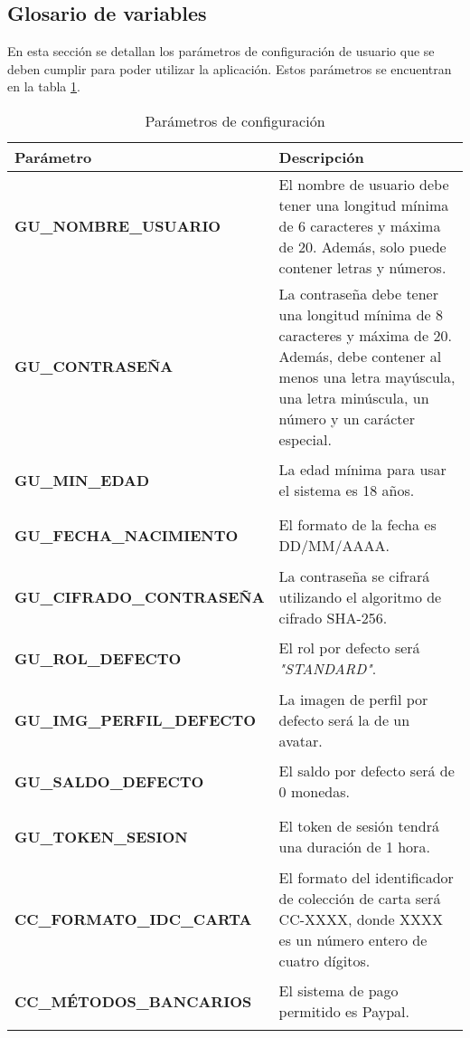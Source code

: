 \subsection{Glosario de variables}\hypertarget{anexo:glosario_variables}{}
En esta sección se detallan los parámetros de configuración de usuario que se deben cumplir para poder utilizar la aplicación. Estos parámetros se encuentran en la tabla \ref{table:variables_requisitos}.
\begin{table}[htb]
    \centering
    \caption{Parámetros de configuración}
    \label{table:variables_requisitos}
    \begin{tabular}{>{\columncolor{lightgreen!20}}p{7cm} p{10cm}}
    \toprule
    \rowcolor{darkgreen!50}
    \textbf{Parámetro} & \textbf{Descripción} \\
    \midrule
    \hypertarget{confParam:gu-nombreUsuario}{}
    \textbf{GU\_NOMBRE\_USUARIO} & El nombre de usuario debe tener una longitud mínima de 6 caracteres y máxima de 20. Además, solo puede contener letras y números.  \\
    \midrule
    \hypertarget{confParam:gu-contrasena}{}
    \textbf{GU\_CONTRASEÑA} & La contraseña debe tener una longitud mínima de 8 caracteres y máxima de 20. Además, debe contener al menos una letra mayúscula, una letra minúscula, un número y un carácter especial. \\
    \midrule
    \hypertarget{confParam:gu-minEdad}{}
    \textbf{GU\_MIN\_EDAD} & La edad mínima para usar el sistema es 18 años. \\
    \midrule
    \hypertarget{confParam:gu-fechaNacimiento}{}
    \textbf{GU\_FECHA\_NACIMIENTO} & El formato  de la fecha es DD/MM/AAAA. \\
    \midrule
    \hypertarget{confParam:gu-cifradoContrasena}{}
    \textbf{GU\_CIFRADO\_CONTRASEÑA} & La contraseña se cifrará utilizando el algoritmo de cifrado SHA-256.  \\
    \midrule
    \hypertarget{confParam:gu-rolDefecto}{}
    \textbf{GU\_ROL\_DEFECTO} & El rol por defecto será \textit{"STANDARD"}. \\
    \midrule
    \hypertarget{confParam:gu-imgPerfilDefecto}{}
    \textbf{GU\_IMG\_PERFIL\_DEFECTO} & La imagen de perfil por defecto será la de un avatar.  \\
    \midrule
    \hypertarget{confParam:gu-saldoDefecto}{}
    \textbf{GU\_SALDO\_DEFECTO} & El saldo por defecto será de 0 monedas. \\
    \midrule
    \hypertarget{confParam:gu-tokenSesion}{}
    \textbf{GU\_TOKEN\_SESION} & El token de sesión tendrá una duración de 1 hora. \\
    \midrule
    \hypertarget{confParam:cc-formatoIDCCarta}{}
    \textbf{CC\_FORMATO\_IDC\_CARTA} & El formato del identificador de colección de carta será CC-XXXX, donde XXXX es un número entero de cuatro dígitos. \\
    \midrule
    \hypertarget{confParam:metodosBancarios}{}
    \textbf{CC\_MÉTODOS\_BANCARIOS} & El sistema de pago permitido es Paypal.\\
    \bottomrule
    \end{tabular}
\end{table}